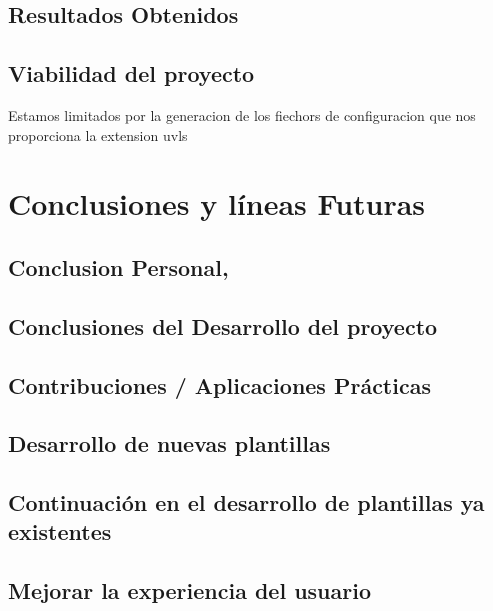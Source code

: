 \documentclass[12pt, a4paper, twoside]{article}
\begin{document}
\subsection{Resultados Obtenidos}
\subsection{Viabilidad del proyecto}
Estamos limitados por la generacion de los fiechors de configuracion que nos proporciona la extension uvls


\section{Conclusiones y líneas Futuras }
\subsection{Conclusion Personal,}
\subsection{Conclusiones del Desarrollo del proyecto}
\subsection{Contribuciones / Aplicaciones Prácticas}
\subsection{Desarrollo de nuevas plantillas }
\subsection{Continuación en el desarrollo de plantillas ya existentes}
\subsection{Mejorar la experiencia del usuario }








\end{document}
